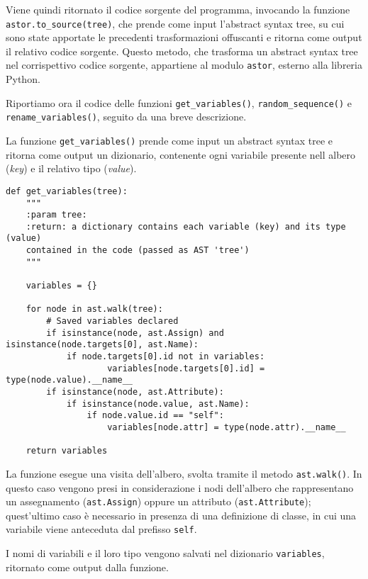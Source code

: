 \documentclass[a4paper,oneside,openright,titlepage,10pt,footinclude,headinclude]{scrbook}
\begin{document}
Viene quindi ritornato il codice sorgente del programma, invocando la funzione  \texttt{astor.to\_source(tree)}, che prende come input l'abstract syntax tree, su cui sono state apportate le precedenti trasformazioni offuscanti e ritorna come output il relativo codice sorgente. Questo metodo, che trasforma un abstract syntax tree nel corrispettivo codice sorgente, appartiene al modulo \texttt{astor}, esterno alla libreria Python.\bigskip


Riportiamo ora il codice delle funzioni \texttt{get\_variables()}, \texttt{random\_sequence()} e \texttt{rename\_variables()}, seguito da una breve descrizione.\smallskip

La funzione \texttt{get\_variables()} prende come input un abstract syntax tree e ritorna come output un dizionario, contenente ogni variabile presente nell albero (\emph{key}) e il relativo tipo (\emph{value}).
\begin{graybox}[innerleftmargin=2,]
\begin{lstlisting}
def get_variables(tree):
    """
    :param tree:
    :return: a dictionary contains each variable (key) and its type (value) 
    contained in the code (passed as AST 'tree')
    """

    variables = {}

    for node in ast.walk(tree):
        # Saved variables declared
        if isinstance(node, ast.Assign) and isinstance(node.targets[0], ast.Name):
            if node.targets[0].id not in variables:
                    variables[node.targets[0].id] = type(node.value).__name__
        if isinstance(node, ast.Attribute):
            if isinstance(node.value, ast.Name):
                if node.value.id == "self":
                    variables[node.attr] = type(node.attr).__name__
        
    return variables
\end{lstlisting}
\end{graybox}

La funzione esegue una visita dell'albero, svolta tramite il metodo \texttt{ast.walk()}. In questo caso vengono presi in considerazione i nodi dell'albero che rappresentano un assegnamento (\texttt{ast.Assign}) oppure un attributo (\texttt{ast.Attribute}); quest'ultimo caso è necessario in presenza di una definizione di classe, in cui una variabile viene anteceduta dal prefisso \texttt{self}.

I nomi di variabili e il loro tipo vengono salvati nel dizionario \texttt{variables}, ritornato come output dalla funzione.\bigskip
\end{document}
